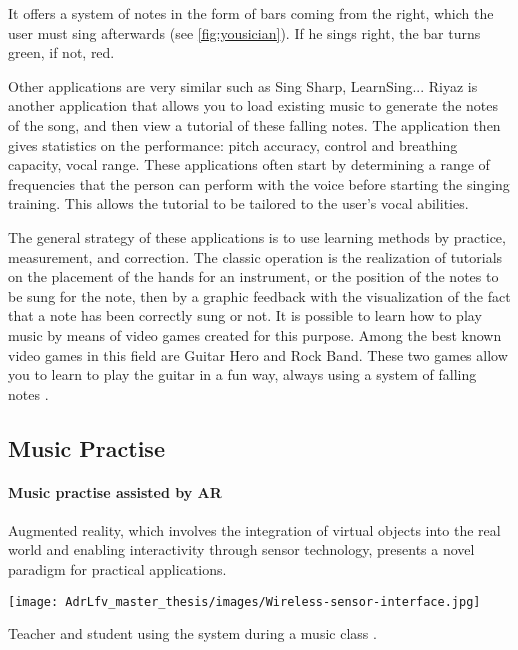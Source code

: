 It offers a system of notes in the form of bars coming from the right, which the user must sing afterwards (see \ref{fig:yousician}). If he sings right, the bar turns green, if not, red.

Other applications are very similar such as Sing Sharp, LearnSing... Riyaz is another application that allows you to load existing music to generate the notes of the song, and then view a tutorial of these falling notes.
The application then gives statistics on the performance: pitch accuracy, control and breathing capacity, vocal range. These applications often start by determining a range of frequencies that the person can perform with the voice before starting the singing training. This allows the tutorial to be tailored to the user’s vocal abilities.

The general strategy of these applications is to use learning methods by practice, measurement, and correction. The classic operation is the realization of tutorials on the placement of the hands for an instrument, or the position of the notes to be sung for the note, then by a graphic feedback with the visualization of the fact that a note has been correctly sung or not.
It is possible to learn how to play music by means of video games created for this purpose. Among the best known video games in this field are Guitar Hero and Rock Band. These two games allow you to learn to play the guitar in a fun way, always using a system of falling notes \cite{farrugia2015tunes}.

\subsection{Music Practise}

\paragraph{Music practise assisted by AR}


Augmented reality, which involves the integration of virtual objects into the real world and enabling interactivity through sensor technology, presents a novel paradigm for practical applications. 

\begin{marginfigure}
    \centering
    \texttt{[image: AdrLfv\_master\_thesis/images/Wireless-sensor-interface.jpg]}
    \caption{Teacher and student using the system during a music class \cite{bevilacqua2007wireless}.}
    \label{fig:Wireless-sensor-interface}
\end{marginfigure}

